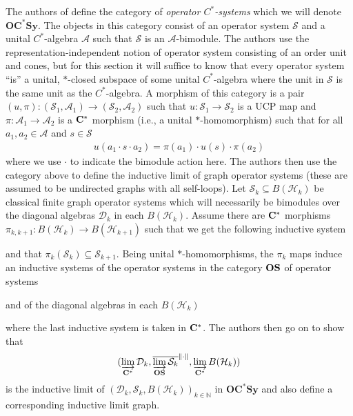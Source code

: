 \documentclass[12pt]{article}
\theoremstyle{definition}
\newcommand{\N}{\mathbb N}
\newcommand{\mc}[1]{\mathcal{#1}}
\newcommand{\<}{\langle}
\renewcommand{\>}{\rangle}
\begin{document}
The authors of \cite{mawtod} define the category of \textit{operator $C^*$-systems} which we will denote ${\mathbf {OC^*Sy}}$. The objects in this category consist of an operator system $\mc S$ and a unital $C^*$-algebra $\mc A$ such that $\mc S$ is an $\mc A$-bimodule. The authors use the representation-independent notion of operator system consisting of an order unit and cones, but for this section it will suffice to know that every operator system ``is'' a unital, $*$-closed subspace of some unital $C^*$-algebra where the unit in $\mc S$ is the same unit as the $C^*$-algebra. A morphism of this category is a pair $(u, \pi): (\mc S_1, \mc A_1) \to (\mc S_2, \mc A_2)$ such that $u: \mc S_1 \to \mc S_2$ is a UCP map and $\pi: \mc A_1 \to \mc A_2$ is a ${\bf C^*}$ morphism (i.e., a unital $*$-homomorphism) such that for all $a_1, a_2 \in \mc A$ and $s \in \mc S$
\begin{align} \label{eqn: opsys morphism}
u(a_1 \cdot s \cdot a_2) = \pi(a_1) \cdot u(s) \cdot \pi(a_2)
\end{align}
where we use $\cdot$ to indicate the bimodule action here. The authors then use the category above to define the inductive limit of graph operator systems (these are assumed to be undirected graphs with all self-loops). Let $\mc S_k \subseteq B(\mc H_k)$ be classical finite graph operator systems which will necessarily be bimodules over the diagonal algebras $\mc D_k$ in each $B(\mc H_k)$. Assume there are ${\bf{C^*}}$ morphisms $\pi_{k,k+1} : B(\mc H_k) \to B( \mc H_{k+1})$ such that we get the following inductive system
\begin{center}
\end{center}
and that $\pi_k(\mc S_k) \subseteq \mc S_{k+1}$. Being unital $*$-homomorphisms, the $\pi_k$ maps induce an inductive systems of the operator systems in the category ${\bf{OS}}$ of operator systems
\begin{center}
\end{center}
and of the diagonal algebras in each $B(\mc H_k)$ 
\begin{center}
\end{center}
where the last inductive system is taken in ${\bf{C^*}}$. The authors then go on to show that
\[
(\varinjlim_{\bf{C^*}}\mc D_k, \overline{\varinjlim_{\bf{OS}} \mc S_k}^{\|\cdot\|}, \varinjlim_{\bf{C^*}}B(\mc H_k))
\]
is the inductive limit of $(\mc D_k, \mc S_k, B(\mc H_k))_{k \in \N}$ in ${\mathbf {OC^*Sy}}$ and also define a corresponding inductive limit graph.
\end{document}
